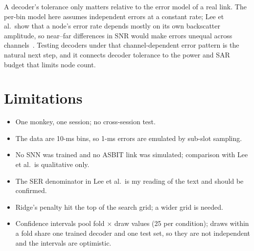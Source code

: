 \documentclass[11pt,a4paper]{article}
\begin{document}
A decoder's tolerance only matters relative to the error model of a real link. The per-bin model here assumes
independent errors at a constant rate; Lee et al.\ show that a node's error rate depends mostly on its own
backscatter amplitude, so near--far differences in SNR would make errors unequal across channels~\cite{lee2024}.
Testing decoders under that channel-dependent error pattern is the natural next step, and it connects decoder
tolerance to the power and SAR budget that limits node count.

\section{Limitations}
\begin{itemize}
  \item One monkey, one session; no cross-session test.
  \item The data are 10-ms bins, so 1-ms errors are emulated by sub-slot sampling.
  \item No SNN was trained and no ASBIT link was simulated; comparison with Lee et al.\ is qualitative only.
  \item The SER denominator in Lee et al.\ is my reading of the text and should be confirmed.
  \item Ridge's penalty hit the top of the search grid; a wider grid is needed.
  \item Confidence intervals pool fold $\times$ draw values (25 per condition); draws within a fold share one trained decoder and one test set, so they are not independent and the intervals are optimistic.
\end{itemize}

\appendix
\end{document}

